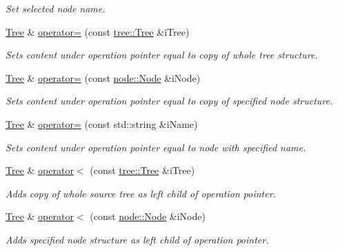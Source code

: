 \begin{DoxyCompactItemize}
\begin{DoxyCompactList}\small\item\em Set selected node name. \end{DoxyCompactList}\item 
\hyperlink{classtree_1_1Tree}{Tree} \& \hyperlink{classtree_1_1Tree_a87196f2bf4aac12cefe77df4515d1665}{operator=} (const \hyperlink{classtree_1_1Tree}{tree\-::\-Tree} \&i\-Tree)
\begin{DoxyCompactList}\small\item\em Sets content under operation pointer equal to {\itshape copy} of whole tree structure. \end{DoxyCompactList}\item 
\hyperlink{classtree_1_1Tree}{Tree} \& \hyperlink{classtree_1_1Tree_ab421f2c2b6ceab773cb5854317186791}{operator=} (const \hyperlink{classnode_1_1Node}{node\-::\-Node} \&i\-Node)
\begin{DoxyCompactList}\small\item\em Sets content under operation pointer equal to {\itshape copy} of specified node structure. \end{DoxyCompactList}\item 
\hyperlink{classtree_1_1Tree}{Tree} \& \hyperlink{classtree_1_1Tree_a310a51f2fecc6f93d57091c364fa4d99}{operator=} (const std\-::string \&i\-Name)
\begin{DoxyCompactList}\small\item\em Sets content under operation pointer equal to node with specified name. \end{DoxyCompactList}\item 
\hyperlink{classtree_1_1Tree}{Tree} \& \hyperlink{classtree_1_1Tree_a3d8e27ab655fed7f4d7b640f30628312}{operator$<$} (const \hyperlink{classtree_1_1Tree}{tree\-::\-Tree} \&i\-Tree)
\begin{DoxyCompactList}\small\item\em Adds {\itshape copy} of whole source tree as left child of operation pointer. \end{DoxyCompactList}\item 
\hyperlink{classtree_1_1Tree}{Tree} \& \hyperlink{classtree_1_1Tree_afccc4be4d4097a231c48385a4c7fc402}{operator$<$} (const \hyperlink{classnode_1_1Node}{node\-::\-Node} \&i\-Node)
\begin{DoxyCompactList}\small\item\em Adds specified node structure as left child of operation pointer. \end{DoxyCompactList}\item 

\end{DoxyCompactItemize}
